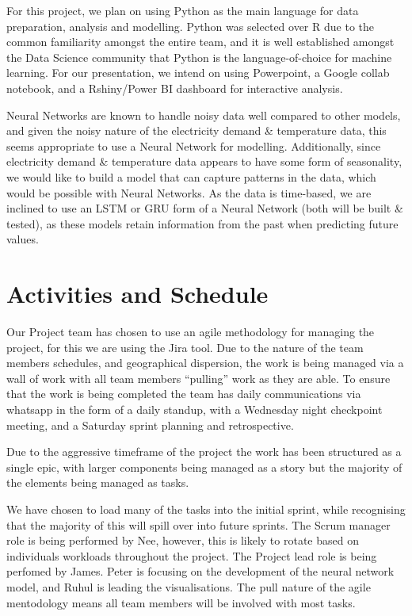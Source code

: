 \documentclass[mstat,12pt]{unswthesis}
\begin{document}
For this project, we plan on using Python as the main language for data
preparation, analysis and modelling. Python was selected over R due to
the common familiarity amongst the entire team, and it is well
established amongst the Data Science community that Python is the
language-of-choice for machine learning. For our presentation, we intend
on using Powerpoint, a Google collab notebook, and a Rshiny/Power BI
dashboard for interactive analysis.

Neural Networks are known to handle noisy data well compared to other
models, and given the noisy nature of the electricity demand \&
temperature data, this seems appropriate to use a Neural Network for
modelling. Additionally, since electricity demand \& temperature data
appears to have some form of seasonality, we would like to build a model
that can capture patterns in the data, which would be possible with
Neural Networks. As the data is time-based, we are inclined to use an
LSTM or GRU form of a Neural Network (both will be built \& tested), as
these models retain information from the past when predicting future
values.

\hypertarget{activities-and-schedule}{%
\section{Activities and Schedule}\label{activities-and-schedule}}

Our Project team has chosen to use an agile methodology for managing the
project, for this we are using the Jira tool. Due to the nature of the
team members schedules, and geographical dispersion, the work is being
managed via a wall of work with all team members ``pulling'' work as
they are able. To ensure that the work is being completed the team has
daily communications via whatsapp in the form of a daily standup, with a
Wednesday night checkpoint meeting, and a Saturday sprint planning and
retrospective.

Due to the aggressive timeframe of the project the work has been
structured as a single epic, with larger components being managed as a
story but the majority of the elements being managed as tasks.

We have chosen to load many of the tasks into the initial sprint, while
recognising that the majority of this will spill over into future
sprints. The Scrum manager role is being performed by Nee, however, this
is likely to rotate based on individuals workloads throughout the
project. The Project lead role is being perfomed by James. Peter is
focusing on the development of the neural network model, and Ruhul is
leading the visualisations. The pull nature of the agile mentodology
means all team members will be involved with most tasks.
\end{document}
